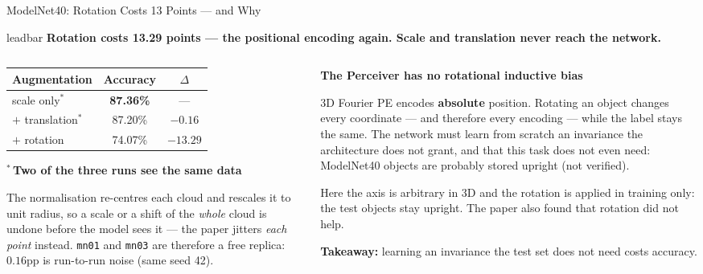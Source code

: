 \documentclass[aspectratio=169,11pt]{beamer}
\newcommand{\lead}[1]{%
  \begin{beamercolorbox}[wd=\textwidth,sep=5pt,center]{leadbar}%
    \small\bfseries #1%
  \end{beamercolorbox}\vspace{0.6em}}
\newcommand{\colhead}[1]{{\color{HeadBlue}\bfseries #1}\par\vspace{0.25em}}
\begin{document}
\begin{frame}[shrink=5]{ModelNet40: Rotation Costs 13 Points --- and Why}
  \lead{Rotation costs 13.29 points — the positional encoding again. Scale and translation never reach the network.}
  \begin{columns}[T]
    \begin{column}{0.46\textwidth}
      \begin{table}
        \centering\small
        \begin{tabular}{lcc}
          \toprule
          \textbf{Augmentation} & \textbf{Accuracy} & \textbf{$\Delta$} \\
          \midrule
          scale only$^{*}$ & \textbf{87.36\%} & --- \\
          $+$ translation$^{*}$ & 87.20\% & $-0.16$ \\
          $+$ rotation & \textcolor{AccentRed}{74.07\%} & \textcolor{AccentRed}{\textbf{$-13.29$}} \\
          \bottomrule
        \end{tabular}
      \end{table}

      \vspace{0.4em}
      \colhead{$^{*}$\,Two of the three runs see the same data}
        \small
        The normalisation re-centres each cloud and rescales it to unit radius, so a scale or a shift of the \emph{whole} cloud is undone before the model sees it --- the paper jitters \emph{each point} instead. \texttt{mn01} and \texttt{mn03} are therefore a free replica: $0.16$pp is run-to-run noise (same seed 42).

    \end{column}
    \begin{column}{0.50\textwidth}
      \colhead{The Perceiver has no rotational inductive bias}
        \small
        3D Fourier PE encodes \textbf{absolute} position. Rotating an object changes every coordinate --- and therefore every encoding --- while the label stays the same. The network must learn from scratch an invariance the architecture does not grant, and that this task does not even need: ModelNet40 objects are probably stored upright (not verified).

        \vspace{0.4em}
        Here the axis is arbitrary in 3D and the rotation is applied in training only: the test objects stay upright. The paper also found that rotation did not help.


      \vspace{0.2em}
      \scriptsize \textbf{Takeaway:} learning an invariance the test set does not need costs accuracy.
    \end{column}
  \end{columns}
\end{frame}
\end{document}
